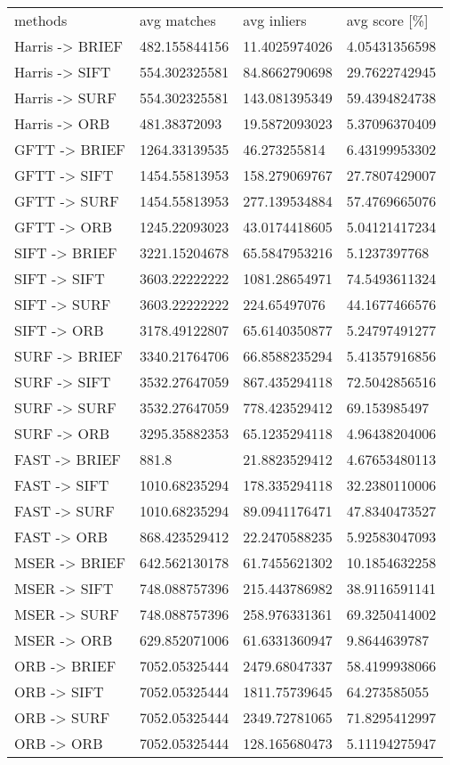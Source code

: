 \begin{tabular}{ l l l l }
	 methods & avg matches & avg inliers & avg score [\%] \\
	 Harris -> BRIEF & 482.155844156 & 11.4025974026 & 4.05431356598 \\
	 Harris -> SIFT & 554.302325581 & 84.8662790698 & 29.7622742945 \\
	 Harris -> SURF & 554.302325581 & 143.081395349 & 59.4394824738 \\
	 Harris -> ORB & 481.38372093 & 19.5872093023 & 5.37096370409 \\
	 GFTT -> BRIEF & 1264.33139535 & 46.273255814 & 6.43199953302 \\
	 GFTT -> SIFT & 1454.55813953 & 158.279069767 & 27.7807429007 \\
	 GFTT -> SURF & 1454.55813953 & 277.139534884 & 57.4769665076 \\
	 GFTT -> ORB & 1245.22093023 & 43.0174418605 & 5.04121417234 \\
	 SIFT -> BRIEF & 3221.15204678 & 65.5847953216 & 5.1237397768 \\
	 SIFT -> SIFT & 3603.22222222 & 1081.28654971 & 74.5493611324 \\
	 SIFT -> SURF & 3603.22222222 & 224.65497076 & 44.1677466576 \\
	 SIFT -> ORB & 3178.49122807 & 65.6140350877 & 5.24797491277 \\
	 SURF -> BRIEF & 3340.21764706 & 66.8588235294 & 5.41357916856 \\
	 SURF -> SIFT & 3532.27647059 & 867.435294118 & 72.5042856516 \\
	 SURF -> SURF & 3532.27647059 & 778.423529412 & 69.153985497 \\
	 SURF -> ORB & 3295.35882353 & 65.1235294118 & 4.96438204006 \\
	 FAST -> BRIEF & 881.8 & 21.8823529412 & 4.67653480113 \\
	 FAST -> SIFT & 1010.68235294 & 178.335294118 & 32.2380110006 \\
	 FAST -> SURF & 1010.68235294 & 89.0941176471 & 47.8340473527 \\
	 FAST -> ORB & 868.423529412 & 22.2470588235 & 5.92583047093 \\
	 MSER -> BRIEF & 642.562130178 & 61.7455621302 & 10.1854632258 \\
	 MSER -> SIFT & 748.088757396 & 215.443786982 & 38.9116591141 \\
	 MSER -> SURF & 748.088757396 & 258.976331361 & 69.3250414002 \\
	 MSER -> ORB & 629.852071006 & 61.6331360947 & 9.8644639787 \\
	 ORB -> BRIEF & 7052.05325444 & 2479.68047337 & 58.4199938066 \\
	 ORB -> SIFT & 7052.05325444 & 1811.75739645 & 64.273585055 \\
	 ORB -> SURF & 7052.05325444 & 2349.72781065 & 71.8295412997 \\
	 ORB -> ORB & 7052.05325444 & 128.165680473 & 5.11194275947
\end{tabular}